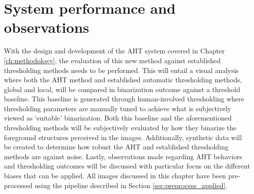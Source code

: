 \chapter{System performance and observations}\label{ch:results}
With the design and development of the AHT system covered in Chapter \ref{ch:methodology}, the evaluation of this new method against established thresholding methods needs to be performed.
This will entail a visual analysis where both the AHT method and established automatic thresholding methods, global and local, will be compared in binarization outcome against a threshold baseline. This baseline is generated through human-involved thresholding where thresholding parameters are manually tuned to achieve what is subjectively viewed as `suitable' binarization. Both this baseline and the aforementioned thresholding methods will be subjectively evaluated by how they binarize the foreground structures perceived in the images.
Additionally, synthetic data will be created to determine how robust the AHT and established thresholding methods are against noise. Lastly, observations made regarding AHT behaviors and thresholding outcomes will be discussed with particular focus on the different biases that can be applied. All images discussed in this chapter have been pre-processed using the pipeline described in Section \ref{sec:preprocess_applied}.

